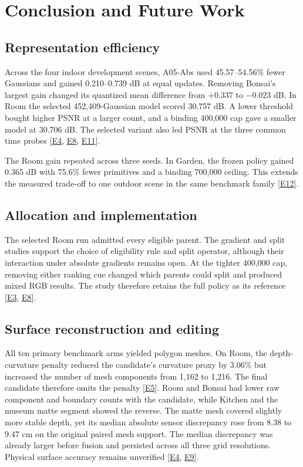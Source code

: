 \section{Conclusion and Future Work}
\subsection{Representation efficiency}
Across the four indoor development scenes, A05-Abs used 45.57--54.56\% fewer Gaussians and gained 0.210--0.739 dB at equal updates. Removing Bonsai's largest gain changed its quantized mean difference from $+0.337$ to $-0.023$ dB. In Room the selected 452,409-Gaussian model scored 30.757 dB. A lower threshold bought higher PSNR at a larger count, and a binding 400,000 cap gave a smaller model at 30.706 dB. The selected variant also led PSNR at the three common time probes [\hyperlink{evE4}{E4}, \hyperlink{evE8}{E8}, \hyperlink{evE11}{E11}].

The Room gain repeated across three seeds. In Garden, the frozen policy gained 0.365 dB with 75.6\% fewer primitives and a binding 700,000 ceiling. This extends the measured trade-off to one outdoor scene in the same benchmark family [\hyperlink{evE12}{E12}].

\subsection{Allocation and implementation}
The selected Room run admitted every eligible parent. The gradient and split studies support the choice of eligibility rule and split operator, although their interaction under absolute gradients remains open. At the tighter 400,000 cap, removing either ranking cue changed which parents could split and produced mixed RGB results. The study therefore retains the full policy as its reference [\hyperlink{evE3}{E3}, \hyperlink{evE8}{E8}].

\subsection{Surface reconstruction and editing}
All ten primary benchmark arms yielded polygon meshes. On Room, the depth-curvature penalty reduced the candidate's curvature proxy by 3.06\% but increased the number of mesh components from 1,162 to 1,216. The final candidate therefore omits the penalty [\hyperlink{evE5}{E5}]. Room and Bonsai had lower raw component and boundary counts with the candidate, while Kitchen and the museum matte segment showed the reverse. The matte mesh covered slightly more stable depth, yet its median absolute sensor discrepancy rose from 8.38 to 9.47 cm on the original paired mesh support. The median discrepancy was already larger before fusion and persisted across all three grid resolutions. Physical surface accuracy remains unverified [\hyperlink{evE4}{E4}, \hyperlink{evE9}{E9}].

